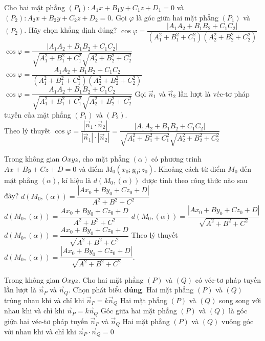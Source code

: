 \begin{ex}%
	Cho hai mặt phẳng $(P_1):A_1x+B_1y+C_1z+D_1=0$ và $(P_2):A_2x+B_2y+C_2z+D_2=0$. Gọi $\varphi$ là góc giữa hai mặt phẳng $(P_1)$ và $(P_2)$. Hãy chọn khẳng định đúng?
	\choice
	{$\cos \varphi =\dfrac{\left|A_1A_2+B_1B_2+C_1C_2\right|}{(A_1^2+B_1^2+C_1^2)(A_2^2+B_2^2+C_2^2)}$}
	{\True $\cos \varphi =\dfrac{\left|A_1A_2+B_1B_2+C_1C_2\right|}{\sqrt{A_1^2+B_1^2+C_1^2}\sqrt{A_2^2+B_2^2+C_2^2}}$}
	{$\cos \varphi =\dfrac{A_1A_2+B_1B_2+C_1C_2}{(A_1^2+B_1^2+C_1^2)(A_2^2+B_2^2+C_2^2)}$}
	{$\cos \varphi =\dfrac{A_1A_2+B_1B_2+C_1C_2}{\sqrt{A_1^2+B_1^2+C_1^2}\sqrt{A_2^2+B_2^2+C_2^2}}$}
	\loigiai
	{
		Gọi $\overrightarrow{n}_1$ và $\overrightarrow{n}_2$ lần lượt là véc-tơ pháp tuyến của mặt phẳng $(P_1)$ và $(P_2)$.\\
		Theo lý thuyết $\cos \varphi = \dfrac{\left|\overrightarrow{n}_1\cdot \overrightarrow{n}_2\right|}{\left|\overrightarrow{n}_1\right|\cdot \left|\overrightarrow{n}_2\right|}=\dfrac{\left|A_1A_2+B_1B_2+C_1C_2\right|}{\sqrt{A_1^2+B_1^2+C_1^2}\sqrt{A_2^2+B_2^2+C_2^2}}$
	}
\end{ex}

\begin{ex}%
	Trong không gian $Oxyz$, cho mặt phẳng $(\alpha)$ có phương trinh $Ax+By+Cz+D=0$ và điểm $M_0\left(x_0;y_0;z_0\right)$. Khoảng cách từ điểm $M_0$ đến mặt phẳng $(\alpha)$, kí hiệu là $d(M_0,(\alpha))$ được tính theo công thức nào sau đây?
	\choice
	{$d(M_0,(\alpha))=\dfrac{\left|Ax_0+By_0+Cz_0+D\right|}{A^2+B^2+C^2}$}
	{$d(M_0,(\alpha))=\dfrac{Ax_0+By_0+Cz_0+D}{A^2+B^2+C^2}$}
	{\True $d(M_0,(\alpha))=\dfrac{\left|Ax_0+By_0+Cz_0+D\right|}{\sqrt{A^2+B^2+C^2}}$}
	{$d(M_0,(\alpha))=\dfrac{Ax_0+By_0+Cz_0+D}{\sqrt{A^2+B^2+C^2}}$}
	\loigiai
	{
		Theo lý thuyết $d(M_0,(\alpha))=\dfrac{\left|Ax_0+By_0+Cz_0+D\right|}{\sqrt{A^2+B^2+C^2}}$.
	}
\end{ex}

\begin{ex}%
	Trong không gian $Oxyz$. Cho hai mặt phẳng $(P)$ và $(Q)$ có véc-tơ pháp tuyến lần lượt là $\overrightarrow{n}_P$ và $\overrightarrow{n}_Q$. Chọn phát biểu \textbf{đúng}.
	\choice
	{Hai mặt phẳng $(P)$ và $(Q)$ trùng nhau khi và chỉ khi $\overrightarrow{n}_P=k \overrightarrow{n}_Q$}
	{Hai mặt phẳng $(P)$ và $(Q)$ song song với nhau khi và chỉ khi $\overrightarrow{n}_P=k \overrightarrow{n}_Q$}
	{Góc giữa hai mặt phẳng $(P)$ và $(Q)$ là góc giữa hai véc-tơ pháp tuyến $\overrightarrow{n}_P$ và $\overrightarrow{n}_Q$}
	{\True Hai mặt phẳng $(P)$ và $(Q)$ vuông góc với nhau khi và chỉ khi $\overrightarrow{n}_P\cdot \overrightarrow{n}_Q =0$}
\end{ex}

